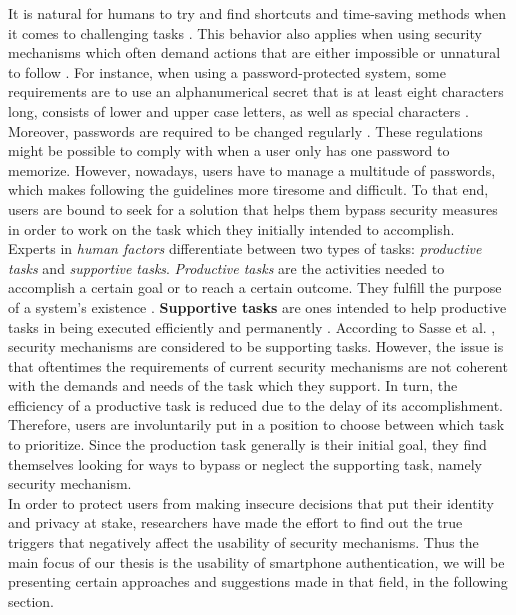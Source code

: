 It is natural for humans to try and find shortcuts and time-saving methods when it comes to challenging tasks \cite{sasse}. This behavior also applies when using security mechanisms which often demand actions that are either impossible or unnatural to follow \cite{sasse}. For instance, when using a password-protected system, some requirements are to use an alphanumerical secret that is at least eight characters long, consists of lower and upper case letters, as well as special characters \cite{payne, sasse}. Moreover, passwords are required to be changed regularly \cite{adams2,gorman}. These regulations might be possible to comply with when a user only has one password to memorize. However, nowadays, users have to manage a multitude of passwords, which makes following the guidelines more tiresome and difficult. To that end, users are bound to seek for a solution that helps them bypass security measures in order to work on the task which they initially intended to accomplish.\\

Experts in \textit{human factors} differentiate between two types of tasks: \textit{productive tasks} and \textit{supportive tasks}. \textit{Productive tasks} are the activities needed to accomplish a certain goal or to reach a certain outcome. They fulfill the purpose of a system's existence \cite{sasse}. \textbf{Supportive tasks} are ones intended to help productive tasks in being executed efficiently and permanently \cite{sasse}. According to Sasse et al. \cite{sasse}, security mechanisms are considered to be supporting tasks. However, the issue is that oftentimes the requirements of current security mechanisms are not coherent with the demands and needs of the task which they support. In turn, the efficiency of a productive task is reduced due to the delay of its accomplishment.  Therefore, users are involuntarily put in a position to choose between which task to prioritize. Since the production task generally is their initial goal, they find themselves looking for ways to bypass or neglect the supporting task, namely security mechanism.\\

In order to protect users from making insecure decisions that put their identity and privacy at stake, researchers have made the effort to find out the true triggers that negatively affect the usability of security mechanisms. Thus the main focus of our thesis is the usability of smartphone authentication, we will be presenting certain approaches and suggestions made in that field, in the following section. 

